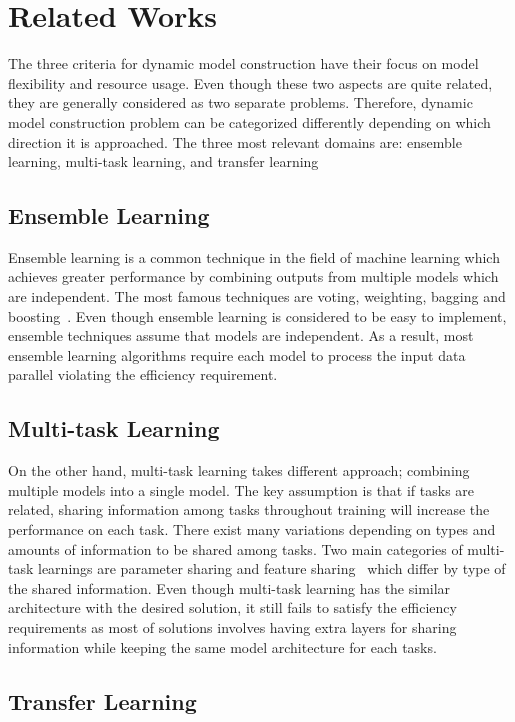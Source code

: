 \documentclass{article}
\begin{document}
\section{Related Works}

The three criteria for dynamic model construction have their focus on model flexibility and resource usage. Even though these two aspects are quite related, they are generally considered as two separate problems. Therefore, dynamic model construction problem can be categorized differently depending on which direction it is approached. The three most relevant domains are: ensemble learning, multi-task learning, and transfer learning

\subsection{Ensemble Learning}
Ensemble learning is a common technique in the field of machine learning which achieves greater performance by combining outputs from multiple models which are independent. The most famous techniques are voting, weighting, bagging and boosting~\cite{dietterich2000ensemble, breiman1996bagging, freund1996experiments}. Even though ensemble learning is considered to be easy to implement, ensemble techniques assume that models are independent. As a result, most ensemble learning algorithms require each model to process the input data parallel violating the efficiency requirement.

\subsection{Multi-task Learning}
On the other hand, multi-task learning takes different approach; combining multiple models into a single model. The key assumption is that if tasks are related, sharing information among tasks throughout training will increase the performance on each task. There exist many variations depending on types and amounts of information to be shared among tasks. Two main categories of multi-task learnings are parameter sharing and feature sharing~\cite{ruder2017overview, Caruana1993MultitaskLA, duong2015low, lu2017fully} which differ by type of the shared information. Even though multi-task learning has the similar architecture with the desired solution, it still fails to satisfy the efficiency requirements as most of solutions involves having extra layers for sharing information while keeping the same model architecture for each tasks.

\subsection{Transfer Learning}
\end{document}

